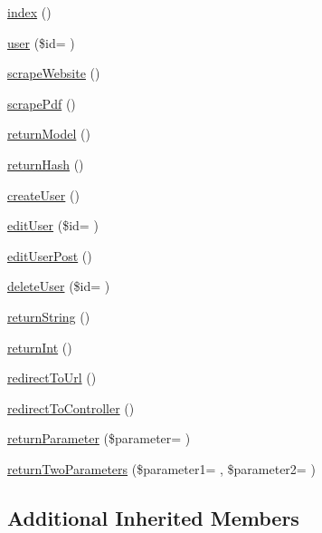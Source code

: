 \begin{DoxyCompactItemize}
\item 
\hyperlink{class_basic_a149eb92716c1084a935e04a8d95f7347}{index} ()
\item 
\hyperlink{class_basic_aaa1766e82db149150ed98413794c1da7}{user} (\$id= \textquotesingle{}\textquotesingle{})
\item 
\hyperlink{class_basic_a48ffe9a27b91ce968b2bcf5e0a9d4069}{scrape\+Website} ()
\item 
\hyperlink{class_basic_a67dbb38567401c856d5361d6704874d5}{scrape\+Pdf} ()
\item 
\hyperlink{class_basic_a7cb6a02987f0faaef2ee4aff9198907e}{return\+Model} ()
\item 
\hyperlink{class_basic_a16df2136bd66a75022f350d583e6c060}{return\+Hash} ()
\item 
\hyperlink{class_basic_a967982ee98f05287bbdba812f6016947}{create\+User} ()
\item 
\hyperlink{class_basic_af33bb7dc63239122119705ef092147e7}{edit\+User} (\$id= \textquotesingle{}\textquotesingle{})
\item 
\hyperlink{class_basic_a445a1f2f42c756bf451de087e36b7193}{edit\+User\+Post} ()
\item 
\hyperlink{class_basic_a1ad1cd8575df67e148023f5e9f9f6a94}{delete\+User} (\$id= \textquotesingle{}\textquotesingle{})
\item 
\hyperlink{class_basic_a5bb666dcea19a9561c2047cfa25936bd}{return\+String} ()
\item 
\hyperlink{class_basic_a8d2918087022004ef5ad62d8f76a73d7}{return\+Int} ()
\item 
\hyperlink{class_basic_abf786273f796a96f5532dc60f9cec813}{redirect\+To\+Url} ()
\item 
\hyperlink{class_basic_a53f01fc4c43d1cecc497d9645f920407}{redirect\+To\+Controller} ()
\item 
\hyperlink{class_basic_ab5cca41d57b6457b974025ce9e2160a0}{return\+Parameter} (\$parameter= \textquotesingle{}\textquotesingle{})
\item 
\hyperlink{class_basic_a3127aa274a2b885e0b94ea8bc8697adb}{return\+Two\+Parameters} (\$parameter1= \textquotesingle{}\textquotesingle{}, \$parameter2= \textquotesingle{}\textquotesingle{})
\end{DoxyCompactItemize}
\subsection*{Additional Inherited Members}


